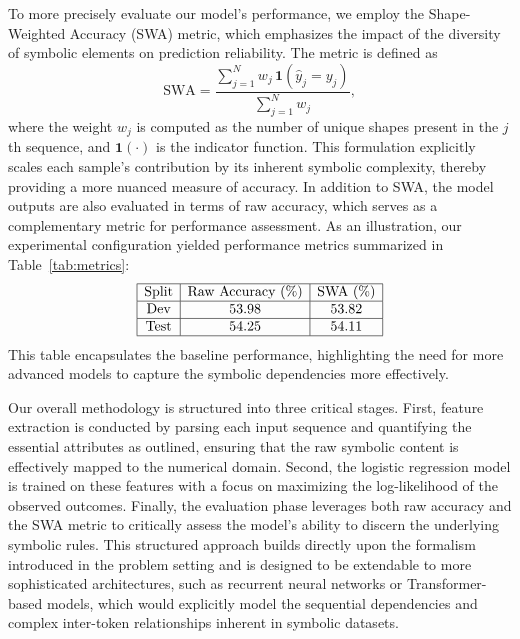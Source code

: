 \documentclass{article}
\begin{document}
To more precisely evaluate our model’s performance, we employ the Shape-Weighted Accuracy (SWA) metric, which emphasizes the impact of the diversity of symbolic elements on prediction reliability. The metric is defined as 
\[
\mathrm{SWA} = \frac{\sum_{j=1}^{N} w_j \, \mathbf{1}(\hat{y}_j = y_j)}{\sum_{j=1}^{N} w_j},
\]
where the weight \( w_j \) is computed as the number of unique shapes present in the \( j \)th sequence, and \( \mathbf{1}(\cdot) \) is the indicator function. This formulation explicitly scales each sample’s contribution by its inherent symbolic complexity, thereby providing a more nuanced measure of accuracy. In addition to SWA, the model outputs are also evaluated in terms of raw accuracy, which serves as a complementary metric for performance assessment. As an illustration, our experimental configuration yielded performance metrics summarized in Table~\ref{tab:metrics}:
\[
\begin{array}{|c|c|c|}
\hline
\text{Split} & \text{Raw Accuracy (\%)} & \text{SWA (\%)} \\
\hline
\text{Dev} & 53.98 & 53.82 \\
\hline
\text{Test} & 54.25 & 54.11 \\
\hline
\end{array}
\]
This table encapsulates the baseline performance, highlighting the need for more advanced models to capture the symbolic dependencies more effectively.

Our overall methodology is structured into three critical stages. First, feature extraction is conducted by parsing each input sequence and quantifying the essential attributes as outlined, ensuring that the raw symbolic content is effectively mapped to the numerical domain. Second, the logistic regression model is trained on these features with a focus on maximizing the log-likelihood of the observed outcomes. Finally, the evaluation phase leverages both raw accuracy and the SWA metric to critically assess the model’s ability to discern the underlying symbolic rules. This structured approach builds directly upon the formalism introduced in the problem setting and is designed to be extendable to more sophisticated architectures, such as recurrent neural networks or Transformer-based models, which would explicitly model the sequential dependencies and complex inter-token relationships inherent in symbolic datasets.
\end{document}
